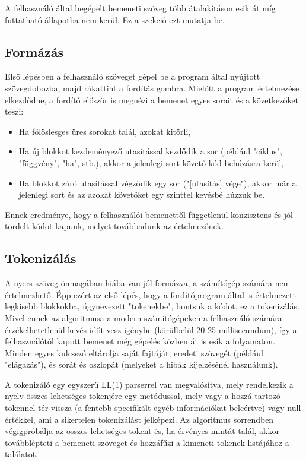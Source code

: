 A felhasználó által begépelt bemeneti szöveg több átalakításon esik át míg futtatható állapotba nem kerül. Ez a szekció ezt mutatja be.

\subsection{Formázás}

Első lépésben a felhasználó szöveget gépel be a program által nyújtott szövegdobozba, majd rákattint a fordítás gombra. Mielőtt a program értelmezése elkezdődne, a fordító először is megnézi a bemenet egyes sorait és a következőket teszi:

\begin{itemize}
    \item Ha fölöslesges üres sorokat talál, azokat kitörli,
    \item Ha új blokkot kezdeményező utasítással kezdődik a sor (például "ciklus", "függvény", "ha", stb.), akkor a jelenlegi sort követő kód behúzásra kerül,
    \item Ha blokkot záró utasítással végződik egy sor ("[utasítás] vége"), akkor már a jelenlegi sort és az azokat követőket egy szinttel kevésbé húzzuk be.
\end{itemize}

Ennek eredménye, hogy a felhasználói bemenettől függetlenül konzisztens és jól tördelt kódot kapunk, melyet továbbadunk az értelmezőnek.

\subsection{Tokenizálás}

A nyers szöveg önmagában hiába van jól formázva, a számítógép számára nem értelmezhető. Épp ezért az első lépés, hogy a fordítóprogram által is értelmezett legkisebb blokkokba, úgynevezett "tokenekbe", bontsuk a kódot, ez a tokenizálás. Mivel ennek az algoritmusa a modern számítógépeken a felhasználó számára érzékelhetetlenül kevés időt vesz igénybe (körülbelül 20-25 millisecundum), így a felhasználótól kapott bemenet még gépelés közben át is esik a folyamaton. Minden egyes kulcsszó eltárolja saját fajtáját, eredeti szövegét (például "elágazás"), és sorát és oszlopát (melyeket a hibák kijelzésénél használunk).

A tokenizáló egy egyszerű LL(1) parserrel van megvalósítva, mely rendelkezik a nyelv összes lehetséges tokenjére egy metódussal, mely vagy a hozzá tartozó tokennel tér vissza (a fentebb specifikált egyéb információkat beleértve) vagy null értékkel, ami a sikertelen tokenizálást jelképezi. Az algoritmus sorrendben végigpróbálja az összes lehetséges tokent és, ha érvényes mintát talál, akkor továbblépteti a bemeneti szöveget és hozzáfűzi a kimeneti tokenek listájához a találatot.

